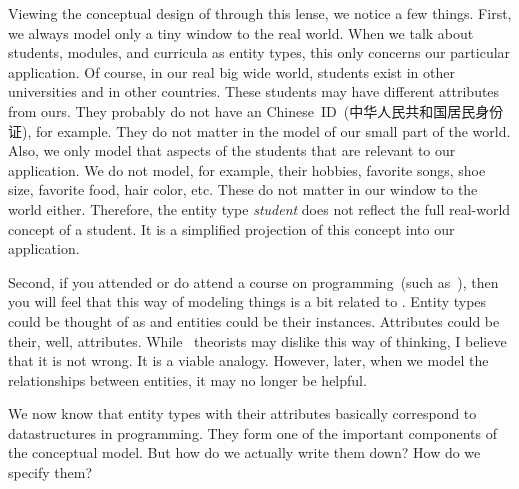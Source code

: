Viewing the conceptual design of  through this lense, we notice a few things.
First, we always model only a tiny window to the real world.
When we talk about students, modules, and curricula as entity types, this only concerns our particular application.
Of course, in our real big wide world, students exist in other universities and in other countries.
These students may have different attributes from ours.
They probably do not have an Chinese~ID~(中华人民共和国居民身份证), for example.
They do not matter in the model of our small part of the world.
Also, we only model that aspects of the students that are relevant to our application.
We do not model, for example, their hobbies, favorite songs, shoe size, favorite food, hair color, etc.
These do not matter in our window to the world either.
Therefore, the entity type \emph{student} does not reflect the full real-world concept of a student.
It is a simplified projection of this concept into our application.

Second, if you attended or do attend a course on programming~(such as~\cite{programmingWithPython}), then you will feel that this way of modeling things is a bit related to .
Entity types could be thought of as  and entities could be their instances.
Attributes could be their, well, attributes.
While \db\ theorists may dislike this way of thinking, I believe that it is not wrong.
It is a viable analogy.
However, later, when we model the relationships between entities, it may no longer be helpful.

We now know that entity types with their attributes basically correspond to datastructures in programming.
They form one of the important components of the conceptual model.
But how do we actually write them down?
How do we specify them?

